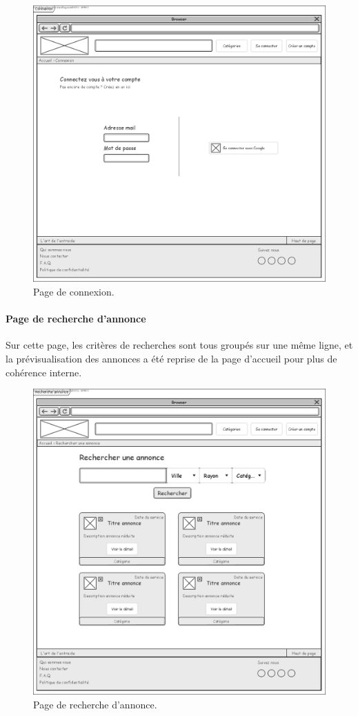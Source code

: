 \documentclass[a4paper,11pt]{article}
\begin{document}
\begin{figure}[H]
  \includegraphics[width=\linewidth]{images/maquette-connexion.png}
  \caption{Page de connexion.}
  \label{fig:maquette-connexion}
\end{figure}
\newpage

\paragraph{Page de recherche d'annonce}

Sur cette page, les critères de recherches sont tous groupés sur une même ligne,
et la prévisualisation des annonces a été reprise de la page d'accueil pour plus de cohérence interne.

\begin{figure}[H]
  \includegraphics[width=\linewidth]{images/maquette-recherche.png}
  \caption{Page de recherche d'annonce.}
  \label{fig:maquette-recherche}
\end{figure}
\newpage
\end{document}
